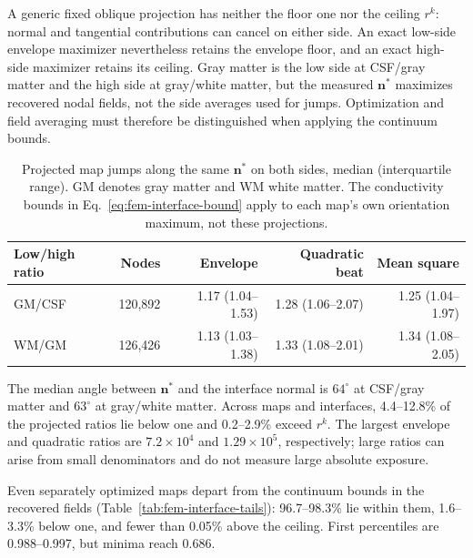 A generic fixed oblique projection has neither the floor one nor the ceiling
$r^k$: normal and tangential contributions can cancel on either side.
An exact low-side envelope maximizer nevertheless retains the envelope floor,
and an exact high-side maximizer retains its ceiling. Gray matter is the
low side at CSF/gray matter and the high side at gray/white matter, but the
measured $\mathbf n^*$ maximizes recovered nodal fields, not the side averages
used for jumps. Optimization and field averaging must therefore be
distinguished when applying the continuum bounds.

\begin{table}[htbp]
\centering\small
\begin{tabular}{@{}lrrrr@{}}
\toprule
Low/high ratio & Nodes & Envelope & Quadratic beat & Mean square\\
\midrule
GM/CSF & 120,892 & 1.17 (1.04--1.53) & 1.28 (1.06--2.07) & 1.25 (1.04--1.97)\\
WM/GM & 126,426 & 1.13 (1.03--1.38) & 1.33 (1.08--2.01) & 1.34 (1.08--2.05)\\
\bottomrule
\end{tabular}
\caption{Projected map jumps along the same $\mathbf n^*$ on both sides,
median (interquartile range). GM denotes gray matter and WM white matter.
The conductivity bounds in Eq.~\eqref{eq:fem-interface-bound} apply to
each map's own orientation maximum, not these projections.}
\label{tab:fem-interface-jumps}
\end{table}

The median angle between $\mathbf n^*$ and the interface normal is $64^\circ$ at
CSF/gray matter and $63^\circ$ at gray/white matter. Across maps and interfaces,
4.4--12.8\% of the projected ratios lie below one and 0.2--2.9\% exceed
$r^k$. The largest envelope and quadratic ratios are $7.2\times10^4$ and
$1.29\times10^5$, respectively; large ratios can arise from small denominators
and do not measure large absolute exposure.

Even separately optimized maps depart from the continuum bounds in the
recovered fields (Table~\ref{tab:fem-interface-tails}): 96.7--98.3\% lie
within them, 1.6--3.3\% below one, and fewer than 0.05\% above the ceiling.
First percentiles are 0.988--0.997, but minima reach 0.686.

